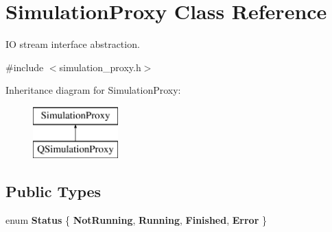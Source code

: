 \hypertarget{class_simulation_proxy}{}\section{Simulation\+Proxy Class Reference}
\label{class_simulation_proxy}


IO stream interface abstraction.  




{\ttfamily \#include $<$simulation\+\_\+proxy.\+h$>$}

Inheritance diagram for Simulation\+Proxy\+:\begin{figure}[H]
\begin{center}
\leavevmode
\includegraphics[height=2.000000cm]{class_simulation_proxy}
\end{center}
\end{figure}
\subsection*{Public Types}
\begin{DoxyCompactItemize}
\item 
\hypertarget{class_simulation_proxy_ab558a4c6e83bfa9c30a7f2829aff1c15}{}\label{class_simulation_proxy_ab558a4c6e83bfa9c30a7f2829aff1c15} 
enum {\bfseries Status} \{ {\bfseries Not\+Running}, 
{\bfseries Running}, 
{\bfseries Finished}, 
{\bfseries Error}
 \}
\end{DoxyCompactItemize}
